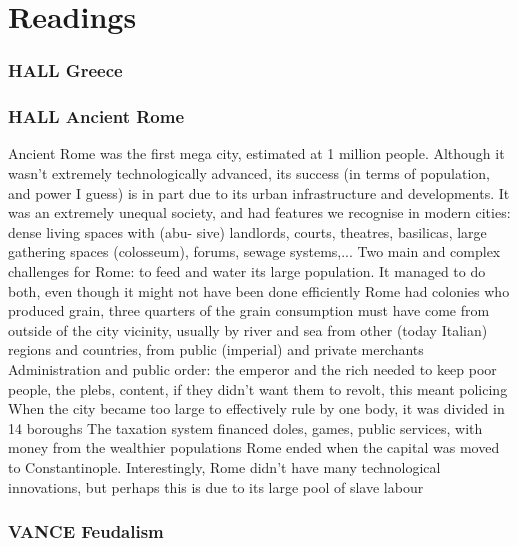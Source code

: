 \documentclass{article}
\begin{document}
\section{Readings}

\subsubsection{HALL Greece}

\subsubsection{HALL Ancient Rome}

\begin{outline}
	\1 Ancient Rome was the first mega city, estimated at 1 million people. Although it wasn’t extremely technologically advanced, its success (in terms of population, and power I guess) is in part due to its urban infrastructure and developments.
	\1 It was an extremely unequal society, and had features we recognise in modern cities: dense living spaces with (abu- sive) landlords, courts, theatres, basilicas, large gathering spaces (colosseum), forums, sewage systems,...
	\1 Two main and complex challenges for Rome: to feed and water its large population. It managed to do both, even though it might not have been done efficiently
	\1 Rome had colonies who produced grain, three quarters of the grain consumption must have come from outside of the city vicinity, usually by river and sea from other (today Italian) regions and countries, from public (imperial) and private merchants
	\1 Administration and public order: the emperor and the rich needed to keep poor people, the plebs, content, if they
didn’t want them to revolt, this meant policing
		\2 When the city became too large to effectively rule by one body, it was divided in 14 boroughs
		\2 The taxation system financed doles, games, public services, with money from the wealthier populations
	\1 Rome ended when the capital was moved to Constantinople. Interestingly, Rome didn’t have many technological innovations, but perhaps this is due to its large pool of slave labour
\end{outline}

\subsubsection{VANCE Feudalism}
\end{document}
